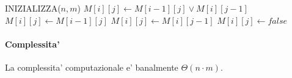 \begin{algorithm}
    \begin{algorithmic}
            \State INIZIALIZZA($n, m$)
                            \State $M[i][j] \gets M[i-1][j] \lor M[i][j-1]$
                        \Else
                            \State $M[i][j] \gets M[i-1][j]$
                        \EndIf
                    \Else
                            \State $M[i][j] \gets M[i][j-1]$
                        \Else
                            \State $M[i][j] \gets false$
                        \EndIf
                    \EndIf
                \EndFor
            \EndFor
        \EndProcedure
    \end{algorithmic}
\end{algorithm}

\paragraph{Complessita'}

La complessita' computazionale e' banalmente $\Theta(n \cdot m)$.